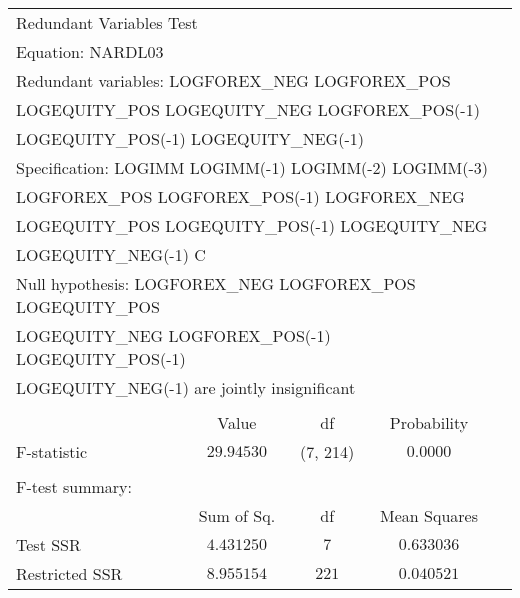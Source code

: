 \begin{tabular}{lrrrr}
\multicolumn{2}{l}{Redundant Variables Test}&\multicolumn{1}{c}{}&\multicolumn{1}{c}{}&\multicolumn{1}{c}{}\\
\multicolumn{1}{l}{Equation: NARDL03}&\multicolumn{1}{c}{}&\multicolumn{1}{c}{}&\multicolumn{1}{c}{}&\multicolumn{1}{c}{}\\
\multicolumn{5}{l}{Redundant variables: LOGFOREX\_NEG LOGFOREX\_POS}\\
\multicolumn{5}{l}{LOGEQUITY\_POS LOGEQUITY\_NEG LOGFOREX\_POS(-1)}\\
\multicolumn{4}{l}{LOGEQUITY\_POS(-1) LOGEQUITY\_NEG(-1)}&\multicolumn{1}{c}{}\\
\multicolumn{5}{l}{Specification: LOGIMM LOGIMM(-1) LOGIMM(-2) LOGIMM(-3)}\\
\multicolumn{5}{l}{LOGFOREX\_POS LOGFOREX\_POS(-1) LOGFOREX\_NEG}\\
\multicolumn{5}{l}{LOGEQUITY\_POS LOGEQUITY\_POS(-1) LOGEQUITY\_NEG}\\
\multicolumn{2}{l}{LOGEQUITY\_NEG(-1) C}&\multicolumn{1}{c}{}&\multicolumn{1}{c}{}&\multicolumn{1}{c}{}\\
\multicolumn{6}{l}{Null hypothesis: LOGFOREX\_NEG LOGFOREX\_POS LOGEQUITY\_POS}\\
\multicolumn{6}{l}{LOGEQUITY\_NEG LOGFOREX\_POS(-1) LOGEQUITY\_POS(-1)}\\
\multicolumn{4}{l}{LOGEQUITY\_NEG(-1) are jointly insignificant}&\multicolumn{1}{c}{}\\
[4.5pt] \hline \\ [-4.5pt]
\multicolumn{1}{c}{}&\multicolumn{1}{c}{Value}&\multicolumn{1}{c}{df}&\multicolumn{1}{c}{Probability}&\multicolumn{1}{c}{}\\
\multicolumn{1}{l}{F-statistic}&\multicolumn{1}{c}{$29.94530$}&\multicolumn{1}{c}{(7, 214)}&\multicolumn{1}{c}{$0.0000$}&\multicolumn{1}{c}{}\\
[4.5pt] \hline \\ [-4.5pt]
\multicolumn{1}{l}{F-test summary:}&\multicolumn{1}{c}{}&\multicolumn{1}{c}{}&\multicolumn{1}{c}{}&\multicolumn{1}{c}{}\\
\multicolumn{1}{c}{}&\multicolumn{1}{c}{Sum of Sq.}&\multicolumn{1}{c}{df}&\multicolumn{1}{c}{Mean Squares}&\multicolumn{1}{c}{}\\
\multicolumn{1}{l}{Test SSR}&\multicolumn{1}{c}{$4.431250$}&\multicolumn{1}{c}{$7$}&\multicolumn{1}{c}{$0.633036$}&\multicolumn{1}{c}{}\\
\multicolumn{1}{l}{Restricted SSR}&\multicolumn{1}{c}{$8.955154$}&\multicolumn{1}{c}{$221$}&\multicolumn{1}{c}{$0.040521$}&\multicolumn{1}{c}{}\\

\end{tabular}
